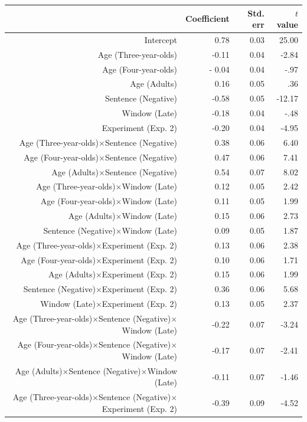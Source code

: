 \documentclass[man]{apa2}
\begin{document}
\begin{table}
\begin{center}
\small\addtolength{\tabcolsep}{-5pt}
\begin{tabular}{rrrr}
  \hline
 & Coefficient  & Std. err & $t$ value \\ 
  \hline
Intercept & 0.78 & 0.03 & 25.00 \\ 
  Age (Three-year-olds) & -0.11 & 0.04 & -2.84 \\ 
  Age (Four-year-olds)&- 0.04 & 0.04 &  -.97\\ 
  Age (Adults) & 0.16 & 0.05 & .36 \\ 
  Sentence (Negative) & -0.58 & 0.05 & -12.17 \\ 
  Window (Late)  & -0.18 & 0.04 & -.48 \\ 
  Experiment (Exp. 2) & -0.20 & 0.04 & -4.95 \\ 
  Age (Three-year-olds)$\times$Sentence (Negative) & 0.38 & 0.06 & 6.40 \\ 
  Age (Four-year-olds)$\times$Sentence (Negative) & 0.47 & 0.06 & 7.41 \\ 
  Age (Adults)$\times$Sentence (Negative) & 0.54 & 0.07 & 8.02 \\ 
  Age (Three-year-olds)$\times$Window (Late)  & 0.12 & 0.05 & 2.42 \\ 
  Age (Four-year-olds)$\times$Window (Late) & 0.11 & 0.05 & 1.99 \\ 
  Age (Adults)$\times$Window (Late)  & 0.15 & 0.06 & 2.73 \\ 
  Sentence (Negative)$\times$Window (Late)  & 0.09 & 0.05 & 1.87 \\ 
  Age (Three-year-olds)$\times$Experiment (Exp. 2)  & 0.13 & 0.06 & 2.38 \\ 
  Age (Four-year-olds)$\times$Experiment (Exp. 2)  & 0.10 & 0.06 & 1.71 \\ 
  Age (Adults)$\times$Experiment (Exp. 2) & 0.15 & 0.06 & 1.99 \\ 
  Sentence (Negative)$\times$Experiment (Exp. 2)& 0.36 & 0.06 & 5.68 \\ 
  Window (Late)$\times$Experiment (Exp. 2)  & 0.13 & 0.05 & 2.37 \\ 
  Age (Three-year-olds)$\times$Sentence (Negative)$\times$Window (Late) & -0.22 & 0.07 & -3.24 \\ 
  Age (Four-year-olds)$\times$Sentence (Negative)$\times$Window (Late)  & -0.17 & 0.07 & -2.41 \\ 
  Age (Adults)$\times$Sentence (Negative)$\times$Window (Late)  & -0.11 & 0.07 & -1.46 \\ 
  Age (Three-year-olds)$\times$Sentence (Negative)$\times$Experiment (Exp. 2)  & -0.39 & 0.09 & -4.52 \\ 

\end{tabular}
\end{center}
\end{table}
\end{document}
